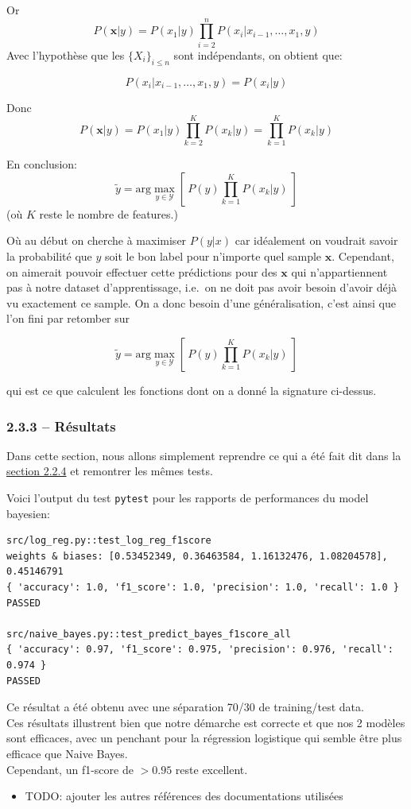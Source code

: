 \documentclass[
]{article}
\providecommand{\tightlist}{%
  \setlength{\itemsep}{0pt}\setlength{\parskip}{0pt}}
\begin{document}
Or \[ 
P(\mathbf{x}| y) = P(x_1 | y) \prod_{i = 2}^{n}{P(x_i | x_{i-1}, \ldots, x_1, y)}
\] Avec l'hypothèse que les \(\{X_i\}_{i \leq n}\) sont indépendants, on
obtient que:

\[P(x_i | x_{i-1}, \ldots, x_1, y) = P(x_i | y)\]

Donc
\[P(\mathbf{x}|y) = P(x_1 | y) \prod_{k = 2}^{K}{P(x_k | y)} = \prod_{k=1}^K{P(x_k | y)}\]

En conclusion:
\[ \tilde{y} = \text{arg}\max_{y \in \mathcal{Y}} \left[\  P(y) \prod_{k = 1}^K{P(x_k | y)}\  \right] \]
(où \(K\) reste le nombre de features.)

Où au début on cherche à maximiser \(P(y | x)\) car idéalement on
voudrait savoir la probabilité que \(y\) soit le bon label pour
n'importe quel sample \(\mathbf{x}\). Cependant, on aimerait pouvoir
effectuer cette prédictions pour des \(\mathbf{x}\) qui n'appartiennent
pas à notre dataset d'apprentissage, i.e.~on ne doit pas avoir besoin
d'avoir déjà vu exactement ce sample. On a donc besoin d'une
généralisation, c'est ainsi que l'on fini par retomber sur

\[ \tilde{y} = \text{arg}\max_{y \in \mathcal{Y}} \left[\  P(y) \prod_{k = 1}^K{P(x_k | y)}\  \right] \]

qui est ce que calculent les fonctions dont on a donné la signature
ci-dessus.

\hypertarget{ruxe9sultats-1}{%
\subsubsection{2.3.3 -- Résultats}\label{ruxe9sultats-1}}

Dans cette section, nous allons simplement reprendre ce qui a été fait
dit dans la \href{#ruxe9sultats}{section 2.2.4} et remontrer les mêmes
tests.

Voici l'output du test \texttt{pytest} pour les rapports de performances
du model bayesien:

\begin{lstlisting}
src/log_reg.py::test_log_reg_f1score 
weights & biases: [0.53452349, 0.36463584, 1.16132476, 1.08204578], 0.45146791  
{ 'accuracy': 1.0, 'f1_score': 1.0, 'precision': 1.0, 'recall': 1.0 }
PASSED

src/naive_bayes.py::test_predict_bayes_f1score_all  
{ 'accuracy': 0.97, 'f1_score': 0.975, 'precision': 0.976, 'recall': 0.974 }
PASSED
\end{lstlisting}

Ce résultat a été obtenu avec une séparation 70/30 de training/test
data.\\
Ces résultats illustrent bien que notre démarche est correcte et que nos
2 modèles sont efficaces, avec un penchant pour la régression logistique
qui semble être plus efficace que Naive Bayes.\\
Cependant, un f1-score de \(> 0.95\) reste excellent.

\newpage{}

\printbibliography[heading=bibintoc, title={Références}]

\begin{itemize}
\tightlist
\item
  TODO: ajouter les autres références des documentations utilisées
\end{itemize}
\end{document}
